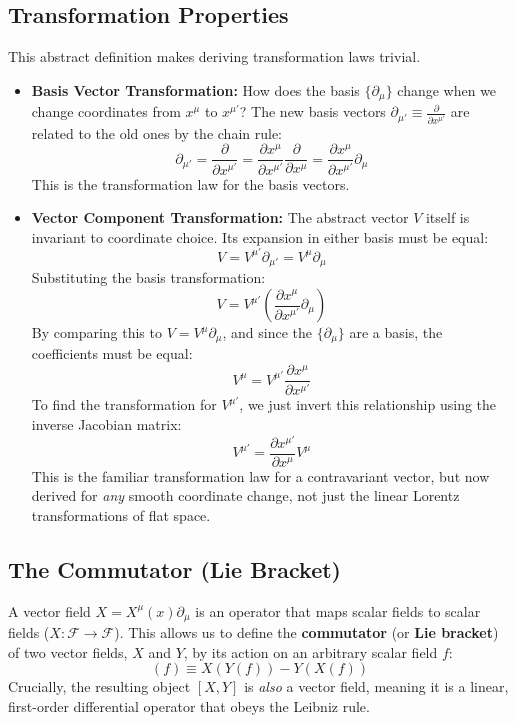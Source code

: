 \documentclass[11pt, a4paper]{report}
\begin{document}
\subsection*{Transformation Properties}
This abstract definition makes deriving transformation laws trivial.
\begin{itemize}
    \item \textbf{Basis Vector Transformation:} How does the basis $\{\partial_\mu\}$ change when we change coordinates from $x^\mu$ to $x^{\mu'}$? The new basis vectors $\partial_{\mu'} \equiv \frac{\partial}{\partial x^{\mu'}}$ are related to the old ones by the chain rule:
    \begin{equation}
        \partial_{\mu'} = \frac{\partial}{\partial x^{\mu'}} = \frac{\partial x^\mu}{\partial x^{\mu'}} \frac{\partial}{\partial x^\mu} = \frac{\partial x^\mu}{\partial x^{\mu'}} \partial_\mu
    \end{equation}
    This is the transformation law for the basis vectors.

    \item \textbf{Vector Component Transformation:} The abstract vector $V$ itself is invariant to coordinate choice. Its expansion in either basis must be equal:
    \[
        V = V^{\mu'} \partial_{\mu'} = V^\mu \partial_\mu
    \]
    Substituting the basis transformation:
    \[
        V = V^{\mu'} \left( \frac{\partial x^\mu}{\partial x^{\mu'}} \partial_\mu \right)
    \]
    By comparing this to $V = V^\mu \partial_\mu$, and since the $\{\partial_\mu\}$ are a basis, the coefficients must be equal:
    \[
        V^\mu = V^{\mu'} \frac{\partial x^\mu}{\partial x^{\mu'}}
    \]
    To find the transformation for $V^{\mu'}$, we just invert this relationship using the inverse Jacobian matrix:
    \begin{equation}
        V^{\mu'} = \frac{\partial x^{\mu'}}{\partial x^\mu} V^\mu
    \end{equation}
    This is the familiar transformation law for a contravariant vector, but now derived for \emph{any} smooth coordinate change, not just the linear Lorentz transformations of flat space.
\end{itemize}
% 
% 
% 
% 
% 
% 
% 
% 
% 
% 
% 
% 
% 
% 
\subsection*{The Commutator (Lie Bracket)}
A vector field $X = X^\mu(x) \partial_\mu$ is an operator that maps scalar fields to scalar fields ($X: \mathcal{F} \to \mathcal{F}$). This allows us to define the \textbf{commutator} (or \textbf{Lie bracket}) of two vector fields, $X$ and $Y$, by its action on an arbitrary scalar field $f$:
\begin{equation}
    [X, Y](f) \equiv X(Y(f)) - Y(X(f))
\end{equation}
Crucially, the resulting object $[X, Y]$ is \emph{also} a vector field, meaning it is a linear, first-order differential operator that obeys the Leibniz rule.
\end{document}
